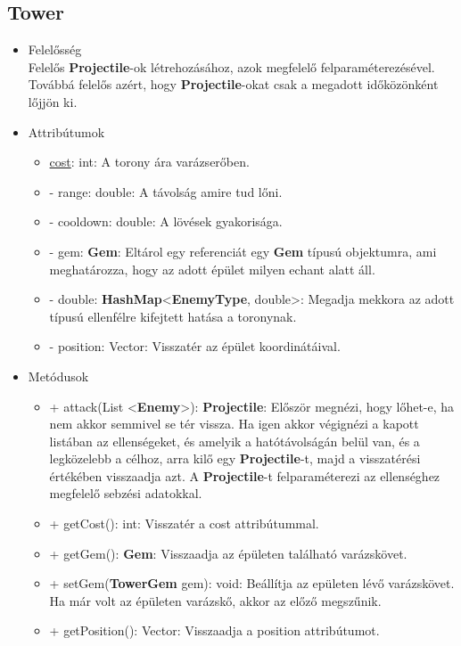 \subsection{Tower}
\begin{itemize}
\item Felelősség\\
Felelős \textbf{Projectile}-ok létrehozásához, azok megfelelő felparaméterezésével. Továbbá felelős azért, hogy \textbf{Projectile}-okat csak a megadott időközönként lőjjön ki.
\item Attribútumok
	\begin{itemize}
		\item \underline{cost}: int: A torony ára varázserőben.
		\item - range: double: A távolság amire tud lőni.
		\item - cooldown: double: A lövések gyakorisága.
		\item - gem: \textbf{Gem}: Eltárol egy referenciát egy \textbf{Gem} típusú objektumra, ami meghatározza, hogy az adott épület milyen echant alatt áll.
		\item - double: \textbf{HashMap}<\textbf{EnemyType}, double>: Megadja mekkora az adott típusú ellenfélre kifejtett hatása a toronynak.
		\item - position: Vector: Visszatér az épület koordinátáival.
	\end{itemize}
\item Metódusok
	\begin{itemize}
		\item + attack(List <\textbf{Enemy}>): \textbf{Projectile}: Először megnézi, hogy lőhet-e, ha nem akkor semmivel se tér vissza. Ha igen akkor végignézi a kapott listában az ellenségeket, és amelyik a hatótávolságán belül van, és a legközelebb a célhoz, arra kilő egy \textbf{Projectile}-t, majd a visszatérési értékében visszaadja azt. A \textbf{Projectile}-t felparaméterezi az ellenséghez megfelelő sebzési adatokkal.
		\item + getCost(): int: Visszatér a cost attribútummal.
		\item + getGem(): \textbf{Gem}: Visszaadja az épületen található varázskövet.
		\item + setGem(\textbf{TowerGem} gem): void: Beállítja az epületen lévő varázskövet. Ha már volt az épületen varázskő, akkor az előző megszűnik.
		\item + getPosition(): Vector: Visszaadja a position attribútumot.
	\end{itemize}
\end{itemize}


